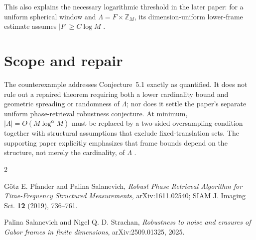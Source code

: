 \documentclass[11pt]{article}
\begin{document}
This also explains the necessary logarithmic threshold in the later paper:
for a uniform spherical window and $\Lambda=F\times\mathbb Z_M$, its
dimension-uniform lower-frame estimate assumes $|F|\geq C\log M$
\cite[Example~4.3(iii)]{bounds}.

\section*{Scope and repair}

The counterexample addresses Conjecture~5.1 exactly as quantified.  It does
not rule out a repaired theorem requiring both a lower cardinality bound and
geometric spreading or randomness of $\Lambda$; nor does it settle the
paper's separate uniform phase-retrieval robustness conjecture.  At minimum,
$|\Lambda|=O(M\log^\alpha M)$ must be replaced by a two-sided oversampling
condition together with structural assumptions that exclude fixed-translation
sets.  The supporting paper explicitly emphasizes that frame bounds depend
on the structure, not merely the cardinality, of $\Lambda$
\cite[Sections~1.2 and~4]{bounds}.

\begin{thebibliography}{2}
\raggedright
{}
G\"otz E. Pfander and Palina Salanevich,
\emph{Robust Phase Retrieval Algorithm for Time-Frequency Structured
Measurements}, arXiv:1611.02540; SIAM J. Imaging Sci. \textbf{12} (2019),
736--761.

Palina Salanevich and Nigel Q. D. Strachan,
\emph{Robustness to noise and erasures of Gabor frames in finite dimensions},
arXiv:2509.01325, 2025.
\end{thebibliography}
\end{document}
